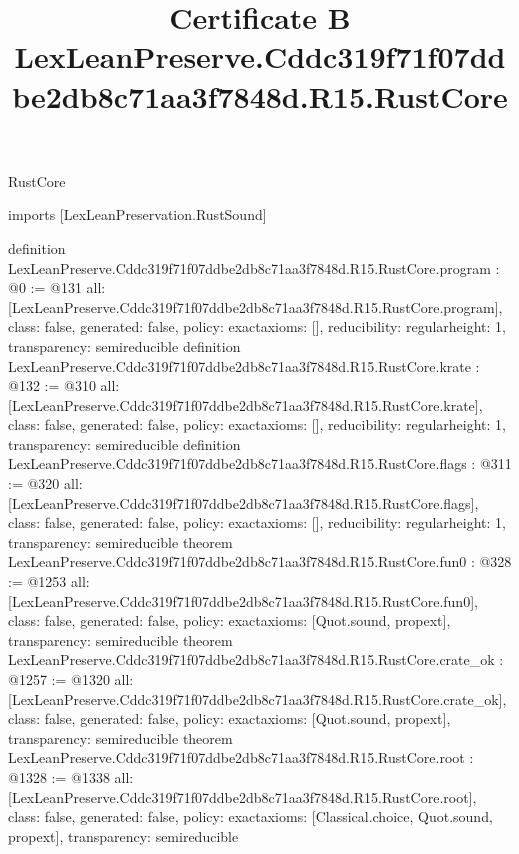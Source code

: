\begin{lexlean}{RustCore}
\title{Certificate B LexLeanPreserve.Cddc319f71f07ddbe2db8c71aa3f7848d.R15.RustCore}
\begin{coremodule}
imports [LexLeanPreservation.RustSound]

definition LexLeanPreserve.Cddc319f71f07ddbe2db8c71aa3f7848d.R15.RustCore.program : @0 := @131 {
  all: [LexLeanPreserve.Cddc319f71f07ddbe2db8c71aa3f7848d.R15.RustCore.program],
  class: false,
  generated: false,
  policy: exact{axioms: []},
  reducibility: regular{height: 1},
  transparency: semireducible
}
definition LexLeanPreserve.Cddc319f71f07ddbe2db8c71aa3f7848d.R15.RustCore.krate : @132 := @310 {
  all: [LexLeanPreserve.Cddc319f71f07ddbe2db8c71aa3f7848d.R15.RustCore.krate],
  class: false,
  generated: false,
  policy: exact{axioms: []},
  reducibility: regular{height: 1},
  transparency: semireducible
}
definition LexLeanPreserve.Cddc319f71f07ddbe2db8c71aa3f7848d.R15.RustCore.flags : @311 := @320 {
  all: [LexLeanPreserve.Cddc319f71f07ddbe2db8c71aa3f7848d.R15.RustCore.flags],
  class: false,
  generated: false,
  policy: exact{axioms: []},
  reducibility: regular{height: 1},
  transparency: semireducible
}
theorem LexLeanPreserve.Cddc319f71f07ddbe2db8c71aa3f7848d.R15.RustCore.fun0 : @328 := @1253 {
  all: [LexLeanPreserve.Cddc319f71f07ddbe2db8c71aa3f7848d.R15.RustCore.fun0],
  class: false,
  generated: false,
  policy: exact{axioms: [Quot.sound, propext]},
  transparency: semireducible
}
theorem LexLeanPreserve.Cddc319f71f07ddbe2db8c71aa3f7848d.R15.RustCore.crate_ok : @1257 := @1320 {
  all: [LexLeanPreserve.Cddc319f71f07ddbe2db8c71aa3f7848d.R15.RustCore.crate_ok],
  class: false,
  generated: false,
  policy: exact{axioms: [Quot.sound, propext]},
  transparency: semireducible
}
theorem LexLeanPreserve.Cddc319f71f07ddbe2db8c71aa3f7848d.R15.RustCore.root : @1328 := @1338 {
  all: [LexLeanPreserve.Cddc319f71f07ddbe2db8c71aa3f7848d.R15.RustCore.root],
  class: false,
  generated: false,
  policy: exact{axioms: [Classical.choice, Quot.sound, propext]},
  transparency: semireducible
}


\end{coremodule}
\end{lexlean}
